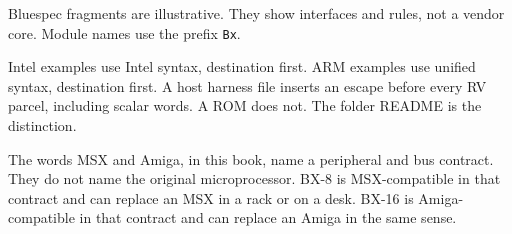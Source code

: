 Bluespec fragments are illustrative. They show interfaces and rules, not a vendor core. Module names use the prefix \texttt{Bx}.

Intel examples use Intel syntax, destination first. ARM examples use unified syntax, destination first. A host harness file inserts an escape before every RV parcel, including scalar words. A ROM does not. The folder README is the distinction.

The words MSX and Amiga, in this book, name a peripheral and bus contract. They do not name the original microprocessor. BX-8 is MSX-compatible in that contract and can replace an MSX in a rack or on a desk. BX-16 is Amiga-compatible in that contract and can replace an Amiga in the same sense.
